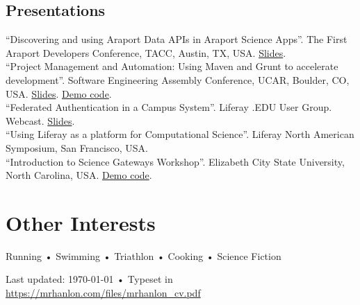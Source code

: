 \documentclass[10pt, a4paper]{article}
\newcommand{\years}[1]{\marginnote{\scriptsize #1}}
\begin{document}
\subsection*{Presentations}
\noindent
\years{2014}``Discovering and using Araport Data APIs in Araport Science Apps''. The First Araport Developers Conference, TACC, Austin, TX, USA. \href{https://github.com/Arabidopsis-Information-Portal/workshop-tutorial-app/blob/tutorial/3/TUTORIAL.md}{Slides}.\\
\years{2014}``Project Management and Automation: Using Maven and Grunt to accelerate development''. Software Engineering Assembly Conference, UCAR, Boulder, CO, USA. \href{https://mrhanlon.com/slides/sea2014}{Slides}. \href{https://github.com/mrhanlon/sea2014-demo}{Demo code}.\\
\years{2014}``Federated Authentication in a Campus System''. Liferay .EDU User Group. Webcast. \href{http://www.slideshare.net/mrhanlon/federated-authe}{Slides}.\\
\years{2013}``Using Liferay as a platform for Computational
Science''. Liferay North American Symposium, San Francisco, USA.\\
\years{2013}``Introduction to Science Gateways Workshop''. Elizabeth City State University, North Carolina, USA. \href{https://bitbucket.org/taccaci/gateway-dna-tutorial}{Demo code}.

%


\section*{Other Interests}
Running • Swimming • Triathlon • Cooking • Science Fiction


\vfill{}

\begin{center}
{\scriptsize  Last updated: \today\- •\-
Typeset in \href{http://nitens.org/taraborelli/cvtex}{
\XeTeX }\\
\href{https://mrhanlon.com/files/mrhanlon_cv.pdf}{https://mrhanlon.com/files/mrhanlon\_cv.pdf}}
\end{center}
\end{document}
